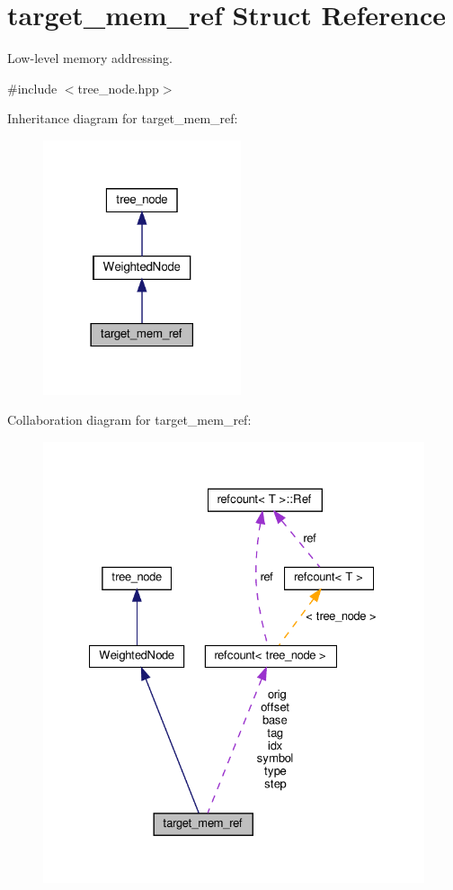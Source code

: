 \hypertarget{structtarget__mem__ref}{}\section{target\+\_\+mem\+\_\+ref Struct Reference}
\label{structtarget__mem__ref}


Low-\/level memory addressing.  




{\ttfamily \#include $<$tree\+\_\+node.\+hpp$>$}



Inheritance diagram for target\+\_\+mem\+\_\+ref\+:
\nopagebreak
\begin{figure}[H]
\begin{center}
\leavevmode
\includegraphics[width=165pt]{d0/de0/structtarget__mem__ref__inherit__graph}
\end{center}
\end{figure}


Collaboration diagram for target\+\_\+mem\+\_\+ref\+:
\nopagebreak
\begin{figure}[H]
\begin{center}
\leavevmode
\includegraphics[width=327pt]{dc/d3a/structtarget__mem__ref__coll__graph}
\end{center}
\end{figure}
